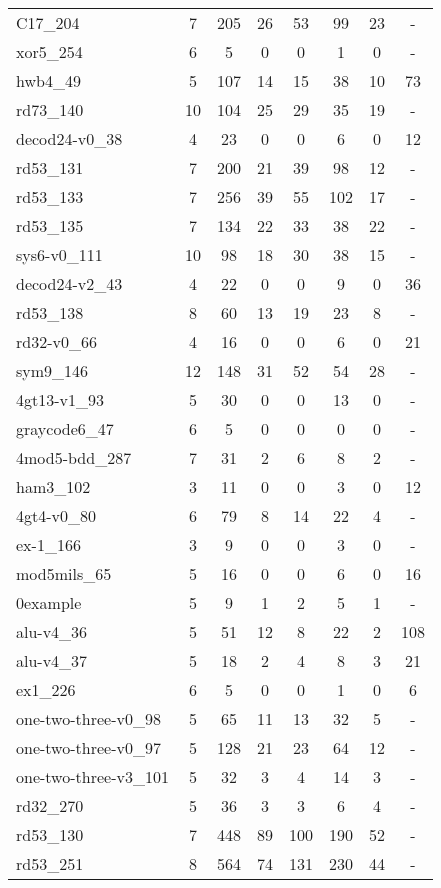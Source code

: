 \documentclass[journal]{IEEEtran}
\begin{document}
\begin{table*}[htbp]
\begin{center}
\begin{tabular}{|p{4.3cm}<{\centering}|c|c|c|c|c|c|c|}
C17\_204 & 7 & 205 & 26 & 53 & 99 & 23 & - \\ 
xor5\_254 & 6 & 5 & 0 & 0 & 1 & 0 & - \\ 
hwb4\_49 & 5 & 107 & 14 & 15 & 38 & 10 & 73 \\ 
rd73\_140 & 10 & 104 & 25 & 29 & 35 & 19 & - \\ 
decod24-v0\_38 & 4 & 23 & 0 & 0 & 6 & 0 & 12 \\ 
rd53\_131 & 7 & 200 & 21 & 39 & 98 & 12 & - \\ 
rd53\_133 & 7 & 256 & 39 & 55 & 102 & 17 & - \\ 
rd53\_135 & 7 & 134 & 22 & 33 & 38 & 22 & - \\ 
sys6-v0\_111 & 10 & 98 & 18 & 30 & 38 & 15 & - \\ 
decod24-v2\_43 & 4 & 22 & 0 & 0 & 9 & 0 & 36 \\ 
rd53\_138 & 8 & 60 & 13 & 19 & 23 & 8 & - \\ 
rd32-v0\_66 & 4 & 16 & 0 & 0 & 6 & 0 & 21 \\ 
sym9\_146 & 12 & 148 & 31 & 52 & 54 & 28 & - \\ 
4gt13-v1\_93 & 5 & 30 & 0 & 0 & 13 & 0 & - \\ 
graycode6\_47 & 6 & 5 & 0 & 0 & 0 & 0 & - \\ 
4mod5-bdd\_287 & 7 & 31 & 2 & 6 & 8 & 2 & - \\ 
ham3\_102 & 3 & 11 & 0 & 0 & 3 & 0 & 12 \\ 
4gt4-v0\_80 & 6 & 79 & 8 & 14 & 22 & 4 & - \\ 
ex-1\_166 & 3 & 9 & 0 & 0 & 3 & 0 & - \\ 
mod5mils\_65 & 5 & 16 & 0 & 0 & 6 & 0 & 16 \\ 
0example & 5 & 9 & 1 & 2 & 5 & 1 & - \\ 
alu-v4\_36 & 5 & 51 & 12 & 8 & 22 & 2 & 108 \\ 
alu-v4\_37 & 5 & 18 & 2 & 4 & 8 & 3 & 21 \\ 
ex1\_226 & 6 & 5 & 0 & 0 & 1 & 0 & 6 \\ 
one-two-three-v0\_98 & 5 & 65 & 11 & 13 & 32 & 5 & - \\ 
one-two-three-v0\_97 & 5 & 128 & 21 & 23 & 64 & 12 & - \\ 
one-two-three-v3\_101 & 5 & 32 & 3 & 4 & 14 & 3 & - \\ 
rd32\_270 & 5 & 36 & 3 & 3 & 6 & 4 & - \\ 
rd53\_130 & 7 & 448 & 89 & 100 & 190 & 52 & - \\ 
rd53\_251 & 8 & 564 & 74 & 131 & 230 & 44 & - \\ 

\end{tabular}
\end{center}
\end{table*}
\end{document}
